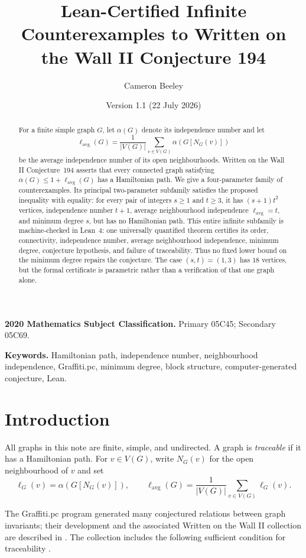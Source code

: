 \documentclass[11pt]{article}
\title{Lean-Certified Infinite Counterexamples to Written on the Wall II Conjecture 194}
\author{Cameron Beeley}
\date{Version 1.1 (22 July 2026)}
\newcommand{\lavg}{\ell_{\mathrm{avg}}}
\begin{document}
\maketitle

\begin{abstract}
For a finite simple graph $G$, let $\alpha(G)$ denote its independence number and let
\[
  \lavg(G)=\frac{1}{|V(G)|}\sum_{v\in V(G)}\alpha(G[N_G(v)])
\]
be the average independence number of its open neighbourhoods.  Written on the Wall II
Conjecture~194 asserts that every connected graph satisfying
$\alpha(G)\leq 1+\lavg(G)$ has a Hamiltonian path.  We give a four-parameter family of
counterexamples.  Its principal two-parameter subfamily satisfies the proposed inequality
with equality: for every pair of integers $s\geq 1$ and $t\geq 3$, it has $(s+1)t^2$
vertices, independence number $t+1$, average neighbourhood independence $\lavg=t$, and
minimum degree $s$, but has no Hamiltonian path.  This entire infinite subfamily is
machine-checked in Lean~4: one universally quantified theorem certifies its order,
connectivity, independence number, average neighbourhood independence, minimum degree,
conjecture hypothesis, and failure of traceability.  Thus no fixed lower bound on the
minimum degree repairs the conjecture.  The case $(s,t)=(1,3)$ has $18$ vertices, but the
formal certificate is parametric rather than a verification of that one graph alone.
\end{abstract}

\medskip
\noindent\textbf{2020 Mathematics Subject Classification.}
Primary 05C45; Secondary 05C69.

\noindent\textbf{Keywords.}
Hamiltonian path, independence number, neighbourhood independence, Graffiti.pc,
minimum degree, block structure, computer-generated conjecture, Lean.

\section{Introduction}

All graphs in this note are finite, simple, and undirected.  A graph is \emph{traceable} if
it has a Hamiltonian path.  For $v\in V(G)$, write $N_G(v)$ for the open neighbourhood of
$v$ and set
\[
  \ell_G(v)=\alpha(G[N_G(v)]),
  \qquad
  \lavg(G)=\frac{1}{|V(G)|}\sum_{v\in V(G)}\ell_G(v).
\]

The Graffiti.pc program generated many conjectured relations between graph invariants;
their development and the associated Written on the Wall II collection are described in
\cite{delavina2005history,delavina2007independence}.  The collection includes the following
sufficient condition for traceability \cite{delavinaWOWII}.
\end{document}
